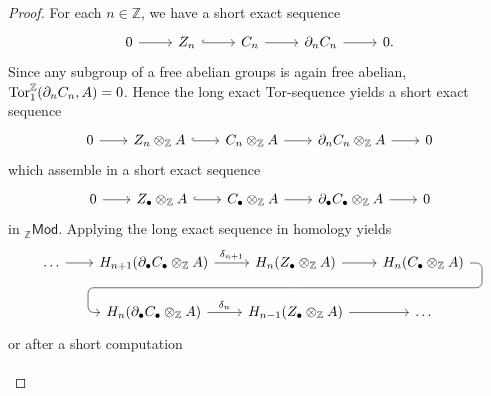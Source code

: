 \begin{proof}
	For each $n \in \mathbb{Z}$, we have a short exact sequence
	\begin{equation*}
		\begin{tikzcd}
			0 \arrow[r] & Z_n \arrow[r,hookrightarrow] & C_n \arrow[r] & \partial_n C_n \arrow[r] & 0.
		\end{tikzcd}
	\end{equation*}
	Since any subgroup of a free abelian groups is again free abelian, $\operatorname{Tor}^\mathbb{Z}_1(\partial_nC_n,A) = 0$. Hence the long exact Tor-sequence yields a short exact sequence
	\begin{equation*}
		\begin{tikzcd}[column sep = 2em]
			0 \arrow[r] & Z_n \otimes_\mathbb{Z} A \arrow[r,hookrightarrow] & C_n \otimes_\mathbb{Z} A \arrow[r] & \partial_nC_n \otimes_\mathbb{Z} A \arrow[r] & 0
		\end{tikzcd}
	\end{equation*}
	\noindent which assemble in a short exact sequence
	\begin{equation*}
		\begin{tikzcd}[column sep = 2em]
			0 \arrow[r] & Z_\bullet \otimes_\mathbb{Z} A \arrow[r,hookrightarrow] & C_\bullet \otimes_\mathbb{Z} A \arrow[r] & \partial_\bullet C_\bullet \otimes_\mathbb{Z} A \arrow[r] & 0
		\end{tikzcd}	
	\end{equation*}
	\noindent in $_\mathbb{Z}\mathsf{Mod}$. Applying the long exact sequence in homology yields
	\begin{equation*}
		\begin{tikzcd}[column sep = 2em]
			\dots \arrow[r] & H_{n + 1}(\partial_\bullet C_\bullet \otimes_\mathbb{Z} A) \arrow[r,"\delta_{n + 1}"] & H_n(Z_\bullet \otimes_\mathbb{Z} A) \arrow[d,phantom, ""{coordinate, name=Z}]\arrow[r] & H_n(C_\bullet \otimes_\mathbb{Z} A) \arrow[dll,rounded corners,
				to path=
				{ -- ([xshift=2ex]\tikztostart.east)
				|- (Z) [near end]\tikztonodes
				-| ([xshift=-2ex]\tikztotarget.west)
				-- (\tikztotarget)}
			] \\
			& H_n(\partial_\bullet C_\bullet \otimes_\mathbb{Z} A) \arrow[r, "\delta_n"] & H_{n - 1}(Z_\bullet \otimes_\mathbb{Z} A) \arrow[r] & \dots
		\end{tikzcd}
	\end{equation*}
	\noindent or after a short computation
	\begin{equation*}
		\begin{tikzcd}[column sep = 2em]

\end{tikzcd}
\end{equation*}
\end{proof}
